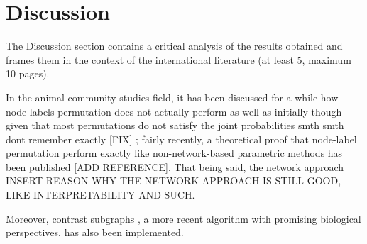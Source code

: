\graphicspath{{chapters/06_discussion/}}
\chapter{Discussion}

The Discussion section contains a critical analysis of the results obtained and frames them
in the context of the international literature (at least 5, maximum 10 pages).

In the animal-community studies field, it has been discussed for a while how node-labels permutation does not actually perform as well as initially though given that most permutations do not satisfy the joint probabilities smth smth dont remember exactly [FIX] \cite{nullmodel2017}; fairly recently, a theoretical proof that node-label permutation perform exactly like non-network-based parametric methods has been published [ADD REFERENCE]. That being said, the network approach INSERT REASON WHY THE NETWORK APPROACH IS STILL GOOD, LIKE INTERPRETABILITY AND SUCH.

Moreover, contrast subgraphs \cite{contrast2020, contrast2023}, a more recent algorithm with promising biological perspectives, has also been implemented.